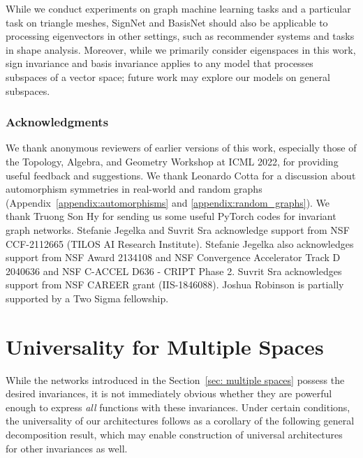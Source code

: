 \documentclass{article} \usepackage{iclr2023_conference,times}
\begin{document}
While we conduct experiments on graph machine learning tasks and a particular task on triangle meshes, SignNet and BasisNet should also be applicable to processing eigenvectors in other settings, such as recommender systems and tasks in shape analysis. Moreover, while we primarily consider eigenspaces in this work, sign invariance and basis invariance applies to any model that processes subspaces of a vector space; future work may explore our models on general subspaces.

\subsubsection*{Acknowledgments}

We thank anonymous reviewers of earlier versions of this work, especially those of the Topology, Algebra, and Geometry Workshop at ICML 2022, for providing useful feedback and suggestions. We thank Leonardo Cotta for a discussion about automorphism symmetries in real-world and random graphs (Appendix~\ref{appendix:automorphisms} and \ref{appendix:random_graphs}). We thank Truong Son Hy for sending us some useful PyTorch codes for invariant graph networks. Stefanie Jegelka and Suvrit Sra acknowledge support from NSF CCF-2112665 (TILOS AI Research Institute). Stefanie Jegelka also acknowledges support from NSF Award 2134108 and NSF Convergence Accelerator Track D 2040636 and NSF C-ACCEL D636 - CRIPT Phase 2. Suvrit Sra acknowledges support from NSF CAREER grant (IIS-1846088).  Joshua Robinson is partially supported by a Two Sigma fellowship. 






\newpage

\appendix


\section{Universality for Multiple Spaces}\label{sec:universality}


While the networks introduced in the Section~\ref{sec: multiple spaces} possess the desired invariances, it is not immediately obvious whether they are  powerful enough to express \emph{all} functions with these invariances.
Under certain conditions, the universality of our architectures follows as a corollary of the following general decomposition result,  which may enable construction of universal  architectures for  other invariances as well.
\end{document}
